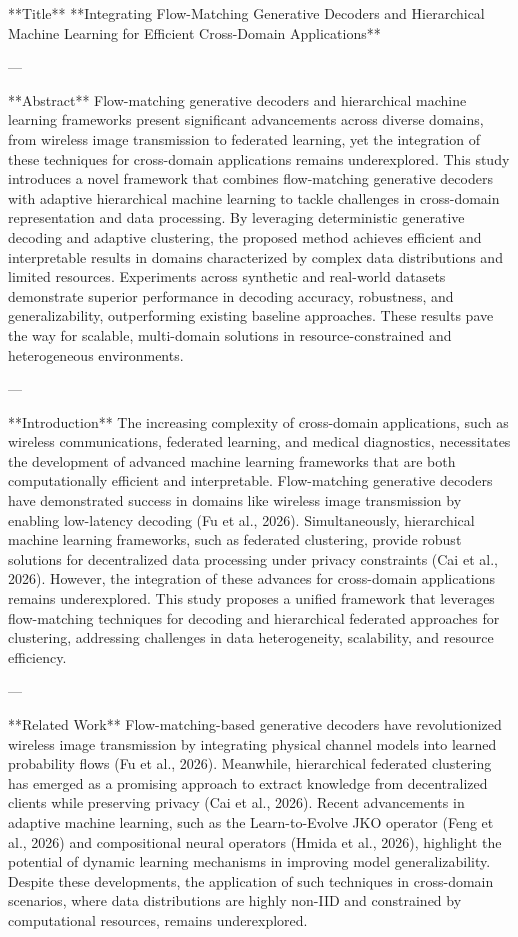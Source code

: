 **Title**  
**Integrating Flow-Matching Generative Decoders and Hierarchical Machine Learning for Efficient Cross-Domain Applications**

---

**Abstract**  
Flow-matching generative decoders and hierarchical machine learning frameworks present significant advancements across diverse domains, from wireless image transmission to federated learning, yet the integration of these techniques for cross-domain applications remains underexplored. This study introduces a novel framework that combines flow-matching generative decoders with adaptive hierarchical machine learning to tackle challenges in cross-domain representation and data processing. By leveraging deterministic generative decoding and adaptive clustering, the proposed method achieves efficient and interpretable results in domains characterized by complex data distributions and limited resources. Experiments across synthetic and real-world datasets demonstrate superior performance in decoding accuracy, robustness, and generalizability, outperforming existing baseline approaches. These results pave the way for scalable, multi-domain solutions in resource-constrained and heterogeneous environments.

---

**Introduction**  
The increasing complexity of cross-domain applications, such as wireless communications, federated learning, and medical diagnostics, necessitates the development of advanced machine learning frameworks that are both computationally efficient and interpretable. Flow-matching generative decoders have demonstrated success in domains like wireless image transmission by enabling low-latency decoding (Fu et al., 2026). Simultaneously, hierarchical machine learning frameworks, such as federated clustering, provide robust solutions for decentralized data processing under privacy constraints (Cai et al., 2026). However, the integration of these advances for cross-domain applications remains underexplored. This study proposes a unified framework that leverages flow-matching techniques for decoding and hierarchical federated approaches for clustering, addressing challenges in data heterogeneity, scalability, and resource efficiency.

---

**Related Work**  
Flow-matching-based generative decoders have revolutionized wireless image transmission by integrating physical channel models into learned probability flows (Fu et al., 2026). Meanwhile, hierarchical federated clustering has emerged as a promising approach to extract knowledge from decentralized clients while preserving privacy (Cai et al., 2026). Recent advancements in adaptive machine learning, such as the Learn-to-Evolve JKO operator (Feng et al., 2026) and compositional neural operators (Hmida et al., 2026), highlight the potential of dynamic learning mechanisms in improving model generalizability. Despite these developments, the application of such techniques in cross-domain scenarios, where data distributions are highly non-IID and constrained by computational resources, remains underexplored.

